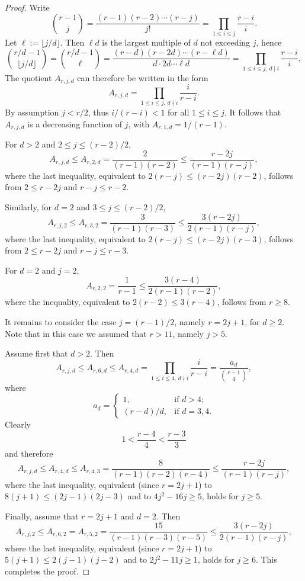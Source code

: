 \begin{proof}
    Write
	\[
	   \binom{r-1}{j}
	   = \frac{(r-1)(r-2) \cdots (r-j)}{j!}
	   = \prod_{1 \le i \le j} \frac{r-i}{i}.
	\]
	Let $\ell := \lfloor j/d \rfloor$. Then $\ell d$ is the largest multiple of $d$ not exceeding $j$, hence
	\[
	   \binom{r/d - 1}{\lfloor j/d \rfloor} 
	   = \binom{r/d - 1}{\ell}
	   = \frac{(r-d)(r-2d)\cdots (r-\ell d)}{d \cdot 2d \cdots \ell d}
	   = \prod_{1 \le i \le j,\, d \mid i} \frac{r-i}{i},
	\]
	The quotient $A_{r,j,d}$ can therefore be written in the form
	\begin{equation*}
		A_{r,j,d} 
		= \prod_{1 \le i \le j,\, d \nmid i} \frac{i}{r-i}.
	\end{equation*}
	By assumption $j < r/2$, thus $i/(r-i) < 1$ for all $1 \le i \le j$. It follows that $A_{r,j,d}$ is a decreasing function of $j$, with $A_{r,1,d} = 1/(r-1)$.
    
    For $d > 2$ and $2 \le j \le (r-2)/2$,
    \[
        A_{r,j,d} \le A_{r,2,d} = \frac{2}{(r-1)(r-2)}
        \le \frac{r-2j}{(r-1)(r-j)},
    \]
    where the last inequality, equivalent to $2(r-j) \le (r-2j)(r-2)$, follows from $2 \le r-2j$ and $r-j \le r-2$. 
	
	Similarly, for $d=2$ and $3 \le j \le (r-2)/2$,
	\[
	   A_{r,j,2} \le A_{r,3,2} = \frac{3}{(r-1)(r-3)} 
	   \le \frac{3(r-2j)}{2(r-1)(r-j)},
	\]
	where the last inequality, equivalent to $2(r-j) \le (r-2j)(r-3)$, follows from $2 \le r-2j$ and $r-j \le r-3$.

    For $d = 2$ and $j = 2$,
    \[
        A_{r,2,2} = \frac{1}{r-1} \le \frac{3(r-4)}{2(r-1)(r-2)},
    \]
    where the inequality, equivalent to $2(r-2) \le 3(r-4)$, follows from $r \ge 8$.
        
	It remains to consider the case $j = (r-1)/2$, namely $r = 2j+1$, for $d \ge 2$.
	Note that in this case we assumed that $r > 11$, namely $j > 5$.
	
	Assume first that $d > 2$. Then 
	\[
        A_{r,j,d} \le A_{r,6,d} \le A_{r,4,d}
        = \prod_{1 \le i \le 4,\, d \nmid i} \frac{i}{r-i}
        = \frac{a_d}{\displaystyle\binom{r-1}{4}},
    \]
    where
    \[
        a_d =
        \begin{cases}
            1, &\text{if } d > 4; \\
            (r-d)/d, &\text{if } d = 3,4.
        \end{cases}
    \]
    Clearly	
	\[
	   1 < \frac{r-4}{4} < \frac{r-3}{3} 
	\]
	and therefore 
	\[
	   A_{r,j,d} \le A_{r,4,d} \le A_{r,4,3} 
	   = \frac{8}{(r-1)(r-2)(r-4)}
	   \le \frac{r-2j}{(r-1)(r-j)},
	\]
	where the last inequality, equivalent (since $r = 2j+1$) to $8(j+1) \le (2j-1)(2j-3)$ and to $4j^2 - 16j \ge 5$, holds for $j \ge 5$.
	
	Finally, assume that $r = 2j+1$ and $d = 2$.
	Then 
	\[
	   A_{r,j,2} \le A_{r,6,2} = A_{r,5,2} 
	   = \frac{15}{(r-1)(r-3)(r-5)}
	   \le \frac{3(r-2j)}{2(r-1)(r-j)},
	\]
	where the last inequality, equivalent (since $r = 2j+1$) to $5(j+1) \le 2(j-1)(j-2)$ and to $2j^2 - 11j \ge 1$, holds for $j \ge 6$.
	This completes the proof.
\end{proof}
	
